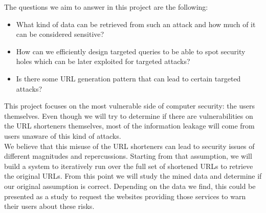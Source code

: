 \documentclass{article}
\begin{document}
The questions we aim to answer in this project are the following:
\begin{itemize}
  \item What kind of data can be retrieved from such an attack and how much of it can be considered sensitive?
  \item How can we efficiently design targeted queries to be able to spot security holes which can be later exploited for targeted attacks?
  \item Is there some URL generation pattern that can lead to certain targeted attacks?
  \end{itemize}
This project focuses on the most vulnerable side of computer security: the users themselves. Even though we will try to determine if there are vulnerabilities on the URL shorteners themselves, most of the information leakage will come from users unaware of this kind of attacks. \\
We believe that this misuse of the URL shorteners can lead to security issues of different magnitudes and repercussions. Starting from that assumption, we will build a system to iteratively run over the full set of shortened URLs to retrieve the original URLs. From this point we will study the mined data and determine if our original assumption is correct. Depending on the data we find, this could be presented as a study to request the websites providing those services to warn their users about these risks.
\end{document}
